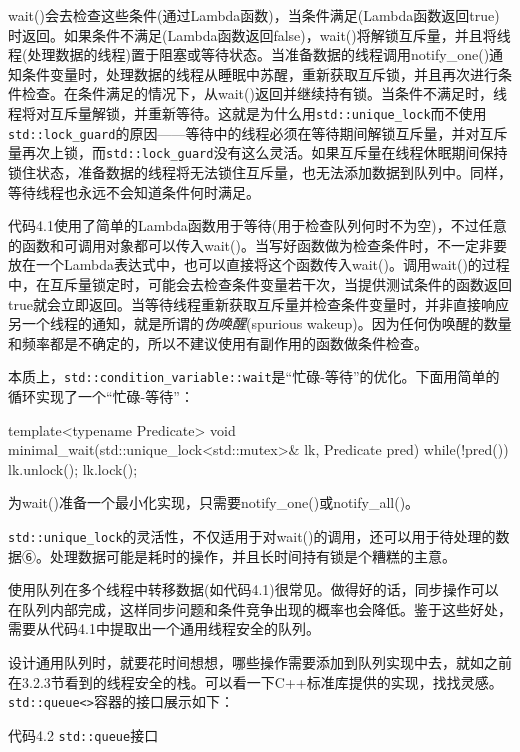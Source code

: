 wait()会去检查这些条件(通过Lambda函数)，当条件满足(Lambda函数返回true)时返回。如果条件不满足(Lambda函数返回false)，wait()将解锁互斥量，并且将线程(处理数据的线程)置于阻塞或等待状态。当准备数据的线程调用notify\_one()通知条件变量时，处理数据的线程从睡眠中苏醒，重新获取互斥锁，并且再次进行条件检查。在条件满足的情况下，从wait()返回并继续持有锁。当条件不满足时，线程将对互斥量解锁，并重新等待。这就是为什么用\texttt{std::unique\_lock}而不使用\texttt{std::lock\_guard}的原因——等待中的线程必须在等待期间解锁互斥量，并对互斥量再次上锁，而\texttt{std::lock\_guard}没有这么灵活。如果互斥量在线程休眠期间保持锁住状态，准备数据的线程将无法锁住互斥量，也无法添加数据到队列中。同样，等待线程也永远不会知道条件何时满足。

代码4.1使用了简单的Lambda函数用于等待(用于检查队列何时不为空)，不过任意的函数和可调用对象都可以传入wait()。当写好函数做为检查条件时，不一定非要放在一个Lambda表达式中，也可以直接将这个函数传入wait()。调用wait()的过程中，在互斥量锁定时，可能会去检查条件变量若干次，当提供测试条件的函数返回true就会立即返回。当等待线程重新获取互斥量并检查条件变量时，并非直接响应另一个线程的通知，就是所谓的\textit{伪唤醒}(spurious wakeup)。因为任何伪唤醒的数量和频率都是不确定的，所以不建议使用有副作用的函数做条件检查。

本质上，\texttt{std::condition\_variable::wait}是“忙碌-等待”的优化。下面用简单的循环实现了一个“忙碌-等待”：

\begin{cpp}
template<typename Predicate>
void minimal_wait(std::unique_lock<std::mutex>& lk, Predicate pred){
  while(!pred()){
    lk.unlock();
    lk.lock();
  }
}
\end{cpp}

为wait()准备一个最小化实现，只需要notify\_one()或notify\_all()。

\texttt{std::unique\_lock}的灵活性，不仅适用于对wait()的调用，还可以用于待处理的数据⑥。处理数据可能是耗时的操作，并且长时间持有锁是个糟糕的主意。

使用队列在多个线程中转移数据(如代码4.1)很常见。做得好的话，同步操作可以在队列内部完成，这样同步问题和条件竞争出现的概率也会降低。鉴于这些好处，需要从代码4.1中提取出一个通用线程安全的队列。


设计通用队列时，就要花时间想想，哪些操作需要添加到队列实现中去，就如之前在3.2.3节看到的线程安全的栈。可以看一下C++标准库提供的实现，找找灵感。\texttt{std::queue<>}容器的接口展示如下：

代码4.2 \texttt{std::queue}接口

